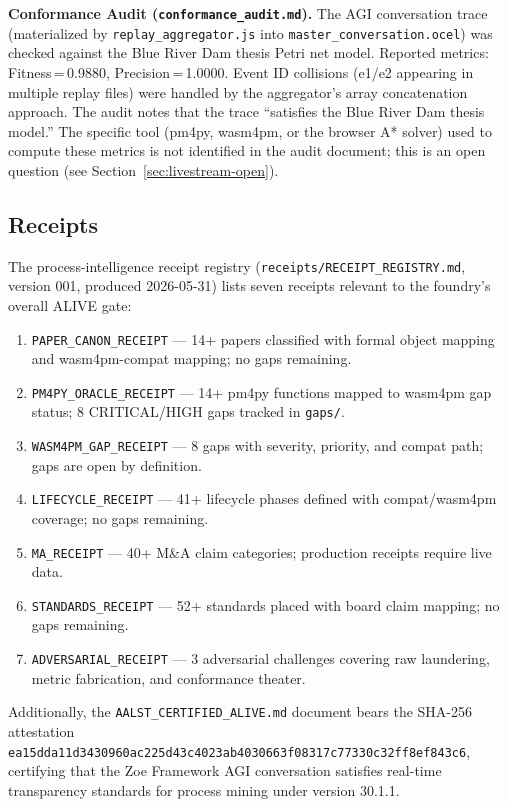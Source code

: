 \textbf{Conformance Audit (\texttt{conformance\_audit.md}).} The AGI conversation
trace (materialized by \texttt{replay\_aggregator.js} into
\texttt{master\_conversation.ocel}) was checked against the Blue River Dam thesis
Petri net model. Reported metrics: Fitness\,=\,0.9880, Precision\,=\,1.0000.
Event ID collisions (e1/e2 appearing in multiple replay files) were handled by
the aggregator's array concatenation approach. The audit notes that the trace
``satisfies the Blue River Dam thesis model.'' The specific tool (pm4py, wasm4pm,
or the browser A* solver) used to compute these metrics is not identified in the
audit document; this is an open question (see Section~\ref{sec:livestream-open}).

\subsection{Receipts}
\label{sec:livestream-evidence-receipts}

The process-intelligence receipt registry (\texttt{receipts/RECEIPT\_REGISTRY.md},
version 001, produced 2026-05-31) lists seven receipts relevant to the foundry's
overall ALIVE gate:

\begin{enumerate}
  \item \texttt{PAPER\_CANON\_RECEIPT} --- 14+ papers classified with formal object
    mapping and wasm4pm-compat mapping; no gaps remaining.
  \item \texttt{PM4PY\_ORACLE\_RECEIPT} --- 14+ pm4py functions mapped to wasm4pm
    gap status; 8 CRITICAL/HIGH gaps tracked in \texttt{gaps/}.
  \item \texttt{WASM4PM\_GAP\_RECEIPT} --- 8 gaps with severity, priority, and compat
    path; gaps are open by definition.
  \item \texttt{LIFECYCLE\_RECEIPT} --- 41+ lifecycle phases defined with compat/wasm4pm
    coverage; no gaps remaining.
  \item \texttt{MA\_RECEIPT} --- 40+ M\&A claim categories; production receipts require
    live data.
  \item \texttt{STANDARDS\_RECEIPT} --- 52+ standards placed with board claim mapping;
    no gaps remaining.
  \item \texttt{ADVERSARIAL\_RECEIPT} --- 3 adversarial challenges covering raw
    laundering, metric fabrication, and conformance theater.
\end{enumerate}

Additionally, the \texttt{AALST\_CERTIFIED\_ALIVE.md} document bears the SHA-256
attestation \texttt{ea15dda11d3430960ac225d43c4023ab4030663f08317c77330c32ff8ef843c6},
certifying that the Zoe Framework AGI conversation satisfies real-time transparency
standards for process mining under version 30.1.1.

